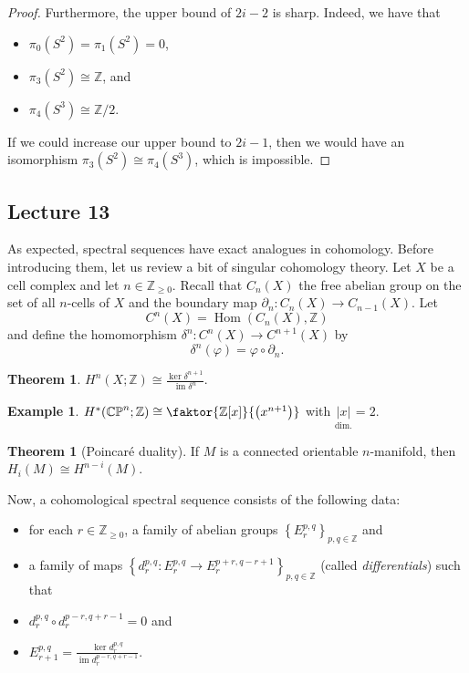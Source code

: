 \documentclass[10pt,letterpaper,cm]{nupset}
\theoremstyle{definition}
\newtheorem{exmp}[defn]{Example}
\theoremstyle{theorem}
\newtheorem{theorem}[defn]{Theorem}
\theoremstyle{remark}
\newcommand{\CP}{\mathbb{CP}}
\newcommand{\Z}{\mathbb Z}
\newcommand{\1}{\mathbb{1}}
\newcommand{\0}{\vec 0}
\DeclareMathOperator{\im}{im}
\DeclareMathOperator{\Hom}{Hom}
\newcommand{\bi}{\begin{itemize}}
\newcommand{\ei}{\end{itemize}}
\begin{document}
\begin{proof}
\medskip


Furthermore, the upper bound of $2i-2$ is sharp. Indeed, we have that
\bi
\item $\pi_0(S^2) = \pi_1(S^2) =0$,
\item $\pi_3(S^2) \cong \Z$, and
\item $\pi_4(S^3) \cong \Z/2$.
\ei
If we could increase our upper bound to $2i-1$, then we would have an isomorphism  $\pi_3(S^2) \cong  \pi_4(S^3)$, which is impossible.
\end{proof}

\subsection{Lecture 13}

As expected, spectral sequences have exact analogues in cohomology.  Before introducing them, let us review a bit of singular cohomology theory.  Let $X$ be a cell complex and let $n\in \Z_{\geq0}$. Recall that $C_n(X)$ the free abelian group on the set of all $n$-cells of $X$ and the boundary map $\partial_n : C_n(X) \to C_{n-1}(X)$. Let $$C^{n}(X) = \Hom(C_{n}(X), \Z) $$ and define the homomorphism $\delta^n : C^n(X) \to C^{n+1}(X)$ by $$\delta^n(\varphi) = \varphi \circ \partial_n.$$

\begin{theorem}\label{cohomiso}
$H^n(X;\Z) \cong \frac{\ker{\delta^{n+1}}}{\im{\delta^n}}$.
\end{theorem}

\begin{exmp}
$H^{\ast}(\CP^n; \Z) \cong \faktor{\Z[x]}{\left(x^{n+1}\right)}$ with $\underset{\text{dim.}}{\left\lvert{x}\right\rvert} =2$.
\end{exmp}

\begin{theorem}[Poincar\'e duality]
If $M$ is a connected orientable $n$-manifold, then $H_i(M) \cong H^{n-i}(M)$.
\end{theorem}

\medskip

Now, a cohomological spectral sequence consists of the following data: 
\bi
\item for each $r\in \Z_{\geq 0}$, a family of abelian groups $\left\{E_r^{p,q}\right\}_{p,q\in \Z}$ and
\item a family of maps  $\left\{d_r^{p,q} : E_r^{p,q} \to E_r^{p+r, q-r+1}\right\}_{p,q\in \Z}$ (called \textit{differentials})  such that
\item $d_r^{p,q} \circ d_r^{p-r, q+r-1} =0$ and
\item $E_{r+1}^{p,q} = \frac{\ker{d_r^{p,q}}}{\im{d_r^{p-r, q+r-1}}}$.
\ei
\end{document}
